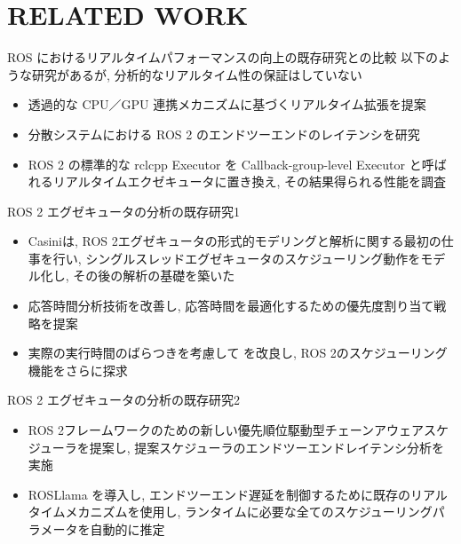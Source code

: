 
\section{RELATED WORK}
\label{sec: related work}


\begin{frame}{ROS におけるリアルタイムパフォーマンスの向上の既存研究との比較}
    以下のような研究があるが, 分析的なリアルタイム性の保証はしていない
    \begin{itemize}
        \item 透過的な CPU／GPU 連携メカニズムに基づくリアルタイム拡張を提案 \cite{suzuki2018real}
        \item 分散システムにおける ROS 2 のエンドツーエンドのレイテンシを研究 \cite{kronauer2021latency}
        \item ROS 2 の標準的な rclcpp Executor を Callback-group-level Executor と呼ばれるリアルタイムエクゼキュータに置き換え, その結果得られる性能を調査 \cite{yang2020exploring}
    \end{itemize}
\end{frame}

\begin{frame}{ROS 2 エグゼキュータの分析の既存研究1}
    \begin{itemize}
        \item Casiniは, ROS 2エグゼキュータの形式的モデリングと解析に関する最初の仕事を行い, シングルスレッドエグゼキュータのスケジューリング動作をモデル化し, その後の解析の基礎を築いた \cite{park2021ros2}
        \item 応答時間分析技術を改善し, 応答時間を最適化するための優先度割り当て戦略を提案 \cite{tang2020response}
        \item 実際の実行時間のばらつきを考慮して \cite{park2021ros2} を改良し, ROS 2のスケジューリング機能をさらに探求 \cite{blass2021ros}
    \end{itemize}
\end{frame}

\begin{frame}{ROS 2 エグゼキュータの分析の既存研究2}
    \begin{itemize}
        \item ROS 2フレームワークのための新しい優先順位駆動型チェーンアウェアスケジューラを提案し, 提案スケジューラのエンドツーエンドレイテンシ分析を実施 \cite{choi2021picas}
        \item ROSLlama を導入し, エンドツーエンド遅延を制御するために既存のリアルタイムメカニズムを使用し, ランタイムに必要な全てのスケジューリングパラメータを自動的に推定 \cite{blass2021automatic}
    \end{itemize}
\end{frame}

